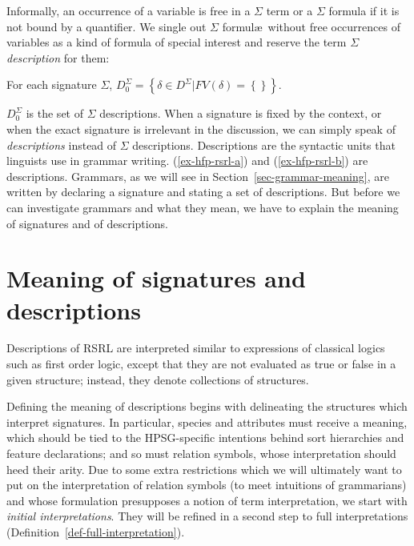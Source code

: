 \documentclass[output=paper
                ,modfonts
                ,nonflat
	        ,collection
	        ,collectionchapter
	        ,collectiontoclongg
 	        ,biblatex
                ,babelshorthands
                ,newtxmath
                ,draftmode
                ,colorlinks, citecolor=brown
]{./langsci/langscibook}
\begin{document}
{{Informally, an occurrence of a variable is free in a $\Sigma$ term or a
$\Sigma$ formula if it is not bound by a quantifier. We single out
$\Sigma$ formul\ae\ without free occurrences of variables as a kind of formula
of special interest and reserve the term $\Sigma$ \emph{description} for them:

\begin{mydef}
  For each signature $\Sigma$,
  $D_0^{\Sigma}=\left\{\delta\in D^{\Sigma} | FV(\delta)=\left\{\right\}\right\}$.
\end{mydef}

$D_0^{\Sigma}$ is the set of $\Sigma$ descriptions.
When a signature is fixed by the context, or when the exact signature is
irrelevant in the discussion, we can simply speak of \emph{descriptions}
instead of $\Sigma$ descriptions. Descriptions are the syntactic units
that linguists use in grammar writing. (\ref{ex-hfp-rsrl-a}) and (\ref{ex-hfp-rsrl-b}) are descriptions. Grammars, as we will see in
Section~\ref{sec-grammar-meaning}, are written by declaring a signature
and stating a set of descriptions. But before we can investigate grammars and
what they mean, we
have to explain the meaning of signatures and of descriptions.


  
\section{Meaning of signatures and descriptions}
\label{sec-meaning}

Descriptions of RSRL are interpreted similar to expressions of
classical logics such as first order logic, except that they are not
evaluated as true or false in a given structure; instead, they denote
collections of structures.

Defining the meaning of descriptions begins with delineating the
structures which interpret signatures. In particular, species and
attributes must receive a meaning, which should be tied to the
HPSG-specific intentions behind sort hierarchies and feature
declarations; and so must relation symbols, whose interpretation
should heed their arity. Due to some extra restrictions which we will
ultimately want to put on the interpretation of relation symbols (to meet
intuitions of grammarians) and whose
formulation presupposes a notion of term interpretation, we start with
\emph{initial interpretations}. They will be refined in a second
step to full interpretations (Definition~\ref{def-full-interpretation}).

}}
\end{document}
